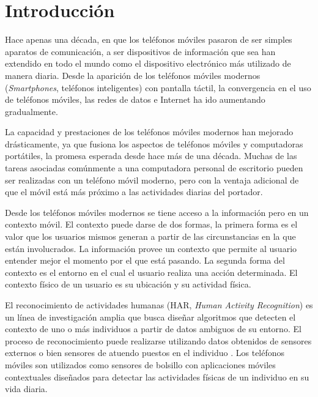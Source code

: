 
\chapter{Introducción}

\label{chap:introduccion}

Hace apenas una década, en que los teléfonos móviles pasaron de ser
simples aparatos de comunicación, a ser dispositivos de información
que sea han extendido en todo el mundo como el dispositivo electrónico
más utilizado de manera diaria. Desde la aparición de los teléfonos
móviles modernos (\emph{Smartphones}, teléfonos inteligentes) con
pantalla táctil, la convergencia en el uso de teléfonos móviles, las
redes de datos e Internet ha ido aumentando gradualmente\cite{fling2009mobile}.

La capacidad y prestaciones de los teléfonos móviles modernos han
mejorado drásticamente, ya que fusiona los aspectos de teléfonos móviles
y computadoras portátiles, la promesa esperada desde hace más de una
década\cite{Tanenbaum2010}. Muchas de las tareas asociadas comúnmente
a una computadora personal de escritorio pueden ser realizadas con
un teléfono móvil moderno, pero con la ventaja adicional de que el
móvil está más próximo a las actividades diarias del portador.

Desde los teléfonos móviles modernos se tiene acceso a la información
pero en un contexto móvil. El contexto puede darse de dos formas,
la primera forma es el valor que los usuarios mismos generan a partir
de las circunstancias en la que están involucrados\cite{fling2009mobile}.
La información provee un contexto que permite al usuario entender
mejor el momento por el que está pasando. La segunda forma del contexto
es el entorno en el cual el usuario realiza una acción determinada\cite{fling2009mobile}.
El contexto físico de un usuario es su ubicación y su actividad física. 

El reconocimiento de actividades humanas (HAR,
\emph{Human Activity Recognition}) es un línea de investigación amplia
que busca diseñar algoritmos que detecten el contexto de uno o más
individuos a partir de datos ambiguos de su entorno\cite{Bao2004}.
El proceso de reconocimiento puede realizarse utilizando datos obtenidos
de sensores externos o bien sensores de atuendo puestos en el individuo
\cite{LaraLabrador2013}. Los teléfonos móviles son utilizados como
sensores de bolsillo con aplicaciones móviles contextuales diseñados
para detectar las actividades físicas de un individuo en su vida diaria. 

